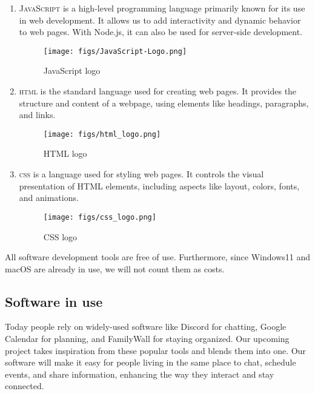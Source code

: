 \documentclass[conference]{IEEEtran}
\begin{document}
\begin{enumerate}
    \item \textsc{JavaScript} is a high-level programming language primarily known for its use in web development. It allows us to add interactivity and dynamic behavior to web pages. With Node.js, it can also be used for server-side development.
        \begin{figure}[H]
        \centering
        \texttt{[image: figs/JavaScript-Logo.png]}
        \caption{JavaScript logo}
        \label{fig:JavaScript logo}
        \end{figure}
    \item \textsc{html} is the standard language used for creating web pages. It provides the structure and content of a webpage, using elements like headings, paragraphs, and links.
        \begin{figure}[H]
        \centering
        \texttt{[image: figs/html\_logo.png]}
        \caption{HTML logo}
        \label{fig:HTML logo}
        \end{figure}
    \item \textsc{css} is a language used for styling web pages. It controls the visual presentation of HTML elements, including aspects like layout, colors, fonts, and animations.
        \begin{figure}[H]
        \centering
        \texttt{[image: figs/css\_logo.png]}
        \caption{CSS logo}
        \label{fig:CSS logo}
        \end{figure}
\end{enumerate}
All software development tools are free of use. Furthermore, since Windows11 and macOS are already in use, we will not count them as costs.
\subsection{Software in use}
Today people rely on widely-used software like Discord for chatting, Google Calendar for planning, and FamilyWall for staying organized. Our upcoming project takes inspiration from these popular tools and blends them into one. Our software will make it easy for people living in the same place to chat, schedule events, and share information, enhancing the way they interact and stay connected.
\end{document}
